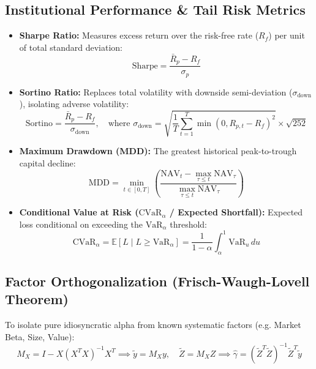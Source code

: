 \documentclass[11pt,a4paper]{article}
\begin{document}
\subsection{Institutional Performance \& Tail Risk Metrics}
\begin{itemize}[leftmargin=1.5em]
    \item \textbf{Sharpe Ratio:} Measures excess return over the risk-free rate ($R_f$) per unit of total standard deviation:
    \begin{equation}
    \text{Sharpe} = \frac{\bar{R}_p - R_f}{\sigma_p}
    \end{equation}
    \item \textbf{Sortino Ratio:} Replaces total volatility with downside semi-deviation ($\sigma_{\text{down}}$), isolating adverse volatility:
    \begin{equation}
    \text{Sortino} = \frac{\bar{R}_p - R_f}{\sigma_{\text{down}}}, \quad \text{where } \sigma_{\text{down}} = \sqrt{\frac{1}{T}\sum_{t=1}^T \min(0, R_{p,t} - R_f)^2} \times \sqrt{252}
    \end{equation}
    \item \textbf{Maximum Drawdown (MDD):} The greatest historical peak-to-trough capital decline:
    \begin{equation}
    \text{MDD} = \min_{t \in [0, T]} \left( \frac{\text{NAV}_t - \max_{\tau \le t} \text{NAV}_\tau}{\max_{\tau \le t} \text{NAV}_\tau} \right)
    \end{equation}
    \item \textbf{Conditional Value at Risk ($\text{CVaR}_\alpha$ / Expected Shortfall):} Expected loss conditional on exceeding the $\text{VaR}_\alpha$ threshold:
    \begin{equation}
    \text{CVaR}_\alpha = \mathbb{E}\left[ L \mid L \ge \text{VaR}_\alpha \right] = \frac{1}{1-\alpha} \int_\alpha^1 \text{VaR}_u \, du
    \end{equation}
\end{itemize}

\subsection{Factor Orthogonalization (Frisch-Waugh-Lovell Theorem)}
To isolate pure idiosyncratic alpha from known systematic factors (e.g. Market Beta, Size, Value):
\begin{equation}
M_X = I - X(X^T X)^{-1} X^T \implies \tilde{y} = M_X y, \quad \tilde{Z} = M_X Z \implies \hat{\gamma} = (\tilde{Z}^T \tilde{Z})^{-1} \tilde{Z}^T \tilde{y}
\end{equation}
\end{document}
